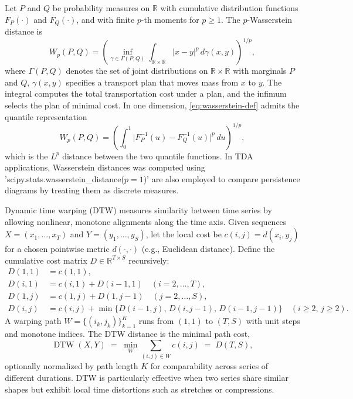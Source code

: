 \documentclass[11pt,reqno]{amsart}
\numberwithin{equation}{section} %
\begin{document}
Let \(P\) and \(Q\) be probability measures on \(\mathbb{R}\) with cumulative distribution functions \(F_{P}(\cdot)\) and \(F_{Q}(\cdot)\), and with finite \(p\)-th moments for \(p \ge 1\). The \(p\)-Wasserstein distance is
\begin{equation}
W_p(P,Q)
= \left(
\inf_{\gamma \in \Gamma(P,Q)}
\int_{\mathbb{R}\times \mathbb{R}} |x-y|^{p}\, d\gamma(x,y)
\right)^{1/p},
\label{eq:wasserstein-def}
\end{equation}
where \(\Gamma(P,Q)\) denotes the set of joint distributions on \(\mathbb{R}\times\mathbb{R}\) with marginals \(P\) and \(Q\), \(\gamma(x,y)\) specifies a transport plan that moves mass from \(x\) to \(y\). The integral computes the total transportation cost under a plan, and the infimum selects the plan of minimal cost. In one dimension, \eqref{eq:wasserstein-def} admits the quantile representation
\begin{equation}
W_p(P,Q)
= \left(
\int_{0}^{1} \big| F_{P}^{-1}(u) - F_{Q}^{-1}(u) \big|^{p}\, du
\right)^{1/p},
\label{eq:wasserstein-quantile}
\end{equation}
which is the \(L^{p}\) distance between the two quantile functions. 
In TDA applications, Wasserstein distances was computed using 'scipy.stats.wasserstein\_distance($p = 1$)' are also employed to compare persistence diagrams by treating them as discrete measures.

Dynamic time warping (DTW) measures similarity between time series by allowing nonlinear, monotone alignments along the time axis\citep{RN3931}. Given sequences \(X=(x_{1},\ldots,x_{T})\) and \(Y=(y_{1},\ldots,y_{S})\), let the local cost be \(c(i,j)=d(x_i,y_j)\) for a chosen pointwise metric \(d(\cdot,\cdot)\) (e.g., Euclidean distance). Define the cumulative cost matrix \(D \in \mathbb{R}^{T\times S}\) recursively:
\begin{equation}
\begin{aligned}
D(1,1) &= c(1,1),\\
D(i,1) &= c(i,1) + D(i-1,1)\quad (i=2,\ldots,T),\\
D(1,j) &= c(1,j) + D(1,j-1)\quad (j=2,\ldots,S),\\
D(i,j) &= c(i,j) + \min\{ D(i-1,j),\, D(i,j-1),\, D(i-1,j-1) \} \quad (i\ge2,\, j\ge2).
\end{aligned}
\label{eq:dtw-recursion}
\end{equation}
A warping path \(W=\{(i_k,j_k)\}_{k=1}^{K}\) runs from \((1,1)\) to \((T,S)\) with unit steps and monotone indices. The DTW distance is the minimal path cost,
\begin{equation}
\operatorname{DTW}(X,Y) \;=\; \min_{W} \sum_{(i,j)\in W} c(i,j)
\;=\; D(T,S),
\label{eq:dtw-distance}
\end{equation}
optionally normalized by path length \(K\) for comparability across series of different durations. DTW is particularly effective when two series share similar shapes but exhibit local time distortions such as stretches or compressions.
\end{document}
